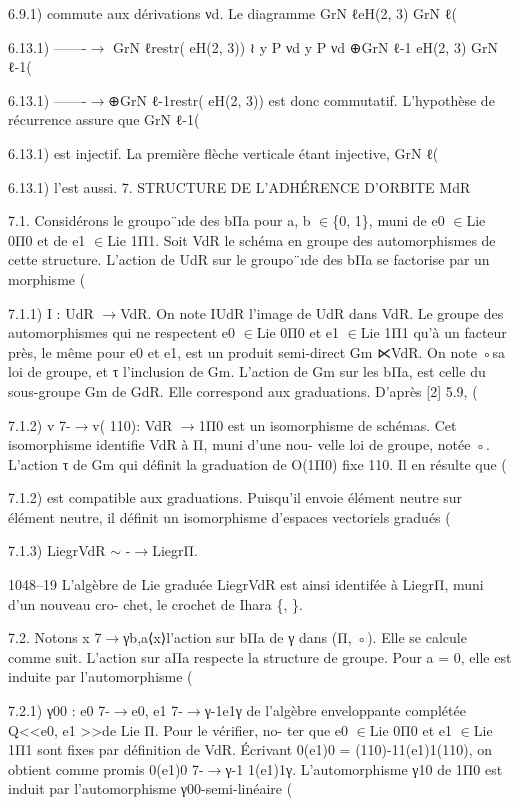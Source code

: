 \documentclass[11pt]{article}
\begin{document}
6.9.1) commute aux dérivations νd. Le diagramme GrN ℓeH(2, 3) GrN ℓ(

6.13.1) -------\(\to\) GrN ℓrestr( eH(2, 3)) ≀ y P νd y P νd ⊕GrN ℓ-1 eH(2, 3) GrN ℓ-1(

6.13.1) -------\(\to\)⊕GrN ℓ-1restr( eH(2, 3)) est donc commutatif. L’hypothèse de récurrence assure que GrN ℓ-1(

6.13.1) est injectif. La première flèche verticale étant injective, GrN ℓ(

6.13.1) l’est aussi. 7. STRUCTURE DE L’ADHÉRENCE D’ORBITE MdR 

7.1. Considérons le groupo¨ıde des bΠa pour a, b \(\in\)\{0, 1\}, muni de e0 \(\in\)Lie 0Π0 et de e1 \(\in\)Lie 1Π1. Soit VdR le schéma en groupe des automorphismes de cette structure. L’action de UdR sur le groupo¨ıde des bΠa se factorise par un morphisme (

7.1.1) I : UdR \(\to\)VdR. On note IUdR l’image de UdR dans VdR. Le groupe des automorphismes qui ne respectent e0 \(\in\)Lie 0Π0 et e1 \(\in\)Lie 1Π1 qu’à un facteur près, le même pour e0 et e1, est un produit semi-direct Gm ⋉VdR. On note ◦sa loi de groupe, et τ l’inclusion de Gm. L’action de Gm sur les bΠa, est celle du sous-groupe Gm de GdR. Elle correspond aux graduations. D’après [2] 5.9, (

7.1.2) v 7-\(\to\)v( 110): VdR \(\to\)1Π0 est un isomorphisme de schémas. Cet isomorphisme identifie VdR à Π, muni d’une nou- velle loi de groupe, notée ◦. L’action τ de Gm qui définit la graduation de O(1Π0) fixe 110. Il en résulte que (

7.1.2) est compatible aux graduations. Puisqu’il envoie élément neutre sur élément neutre, il définit un isomorphisme d’espaces vectoriels gradués (

7.1.3) LiegrVdR \(\sim\) -\(\to\)LiegrΠ.

1048--19 L’algèbre de Lie graduée LiegrVdR est ainsi identifée à LiegrΠ, muni d’un nouveau cro- chet, le crochet de Ihara \{, \}. 

7.2. Notons x 7\(\to\)γb,a⟨x⟩l’action sur bΠa de γ dans (Π, ◦). Elle se calcule comme suit. L’action sur aΠa respecte la structure de groupe. Pour a = 0, elle est induite par l’automorphisme (

7.2.1) γ00 : e0 7-\(\to\)e0, e1 7-\(\to\)γ-1e1γ de l’algèbre enveloppante complétée Q<<e0, e1 >>de Lie Π. Pour le vérifier, no- ter que e0 \(\in\)Lie 0Π0 et e1 \(\in\)Lie 1Π1 sont fixes par définition de VdR. Écrivant 0(e1)0 = (110)-11(e1)1(110), on obtient comme promis 0(e1)0 7-\(\to\)γ-1 1(e1)1γ. L’automorphisme γ10 de 1Π0 est induit par l’automorphisme γ00-semi-linéaire (
\end{document}
